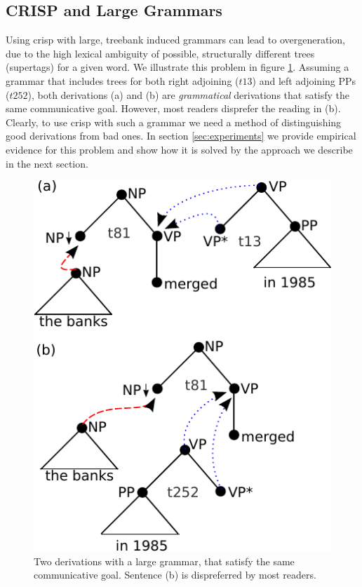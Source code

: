 \subsection{CRISP and Large Grammars}
Using {\sc crisp} with large, treebank induced grammars can lead to overgeneration, 
due to the high lexical ambiguity of possible, structurally different trees (supertags) for a given word. We illustrate this problem in figure \ref{fig:overgen}. Assuming a grammar that includes trees for both right adjoining ($t13$) and left adjoining PPs ($t252$), both derivations (a) and (b) are {\it grammatical} derivations that satisfy the same communicative goal. However, most readers disprefer the reading in (b). 
Clearly, to use {\sc crisp} with such a grammar we need a method of distinguishing good derivations from bad ones. In section \ref{sec:experiments} we provide empirical evidence for this problem and show how it is solved by the approach we describe in the next section. 
\begin{figure}
\begin{center}
\includegraphics[width=.3\textwidth]{figures/overgen.pdf}
\caption{\label{fig:overgen} Two derivations with a large grammar, that satisfy the same communicative goal. Sentence (b) is dispreferred by most readers.}
\end{center}
\end{figure} 

